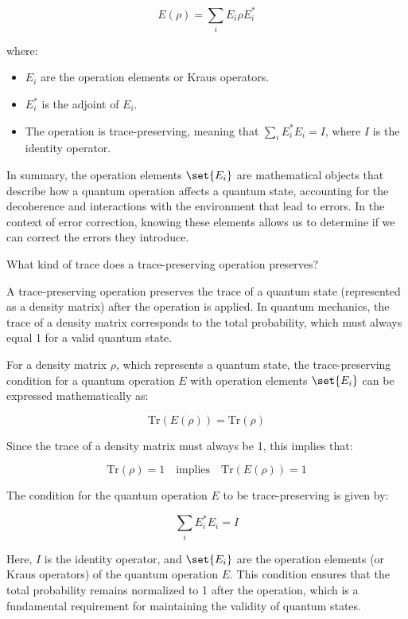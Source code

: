 \begin{airesult}
\[
E(\rho) = \sum_i E_i \rho E_i^{*}
\]

where:

\begin{itemize}
  \item $E_i$ are the operation elements or Kraus operators.
  \item $E_i^{*}$ is the adjoint of $E_i$.
  \item The operation is trace-preserving, meaning that $\sum_i E_i^{*} E_i = I$, where $I$ is the
identity operator.
\end{itemize}

\vsp

In summary, the operation elements $\set{E_i}$ are mathematical objects that describe how a quantum
operation affects a quantum state, accounting for the decoherence and interactions with the
environment that lead to errors. In the context of error correction, knowing these elements allows
us to determine if we can correct the errors they introduce.
\end{airesult}

\begin{ai}
What kind of trace does a trace-preserving operation preserves?
\end{ai}

\begin{airesult}
A trace-preserving operation preserves the trace of a quantum state (represented as a density
matrix) after the operation is applied. In quantum mechanics, the trace of a density matrix
corresponds to the total probability, which must always equal 1 for a valid quantum state.

\vsp

For a density matrix $\rho$, which represents a quantum state, the trace-preserving condition for a
quantum operation $E$ with operation elements $\set{E_i}$ can be expressed mathematically as:

\[
\mathrm{Tr}(E(\rho)) = \mathrm{Tr}(\rho)
\]

Since the trace of a density matrix must always be 1, this implies that:

\[
\mathrm{Tr}(\rho) = 1 \quad \text{implies} \quad \mathrm{Tr}(E(\rho)) = 1
\]

\vsp

The condition for the quantum operation $E$ to be trace-preserving is given by:

\[
\sum_i E_i^{*} E_i = I
\]

Here, $I$ is the identity operator, and $\set{E_i}$ are the operation elements (or Kraus operators)
of the quantum operation $E$. This condition ensures that the total probability remains normalized
to 1 after the operation, which is a fundamental requirement for maintaining the validity of quantum
states.
\end{airesult}

